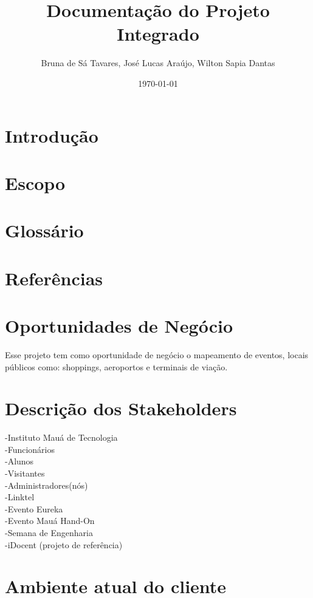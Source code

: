 \documentclass[13pt]{article}
\begin{document}
\title{Documentação do Projeto Integrado}
\author{Bruna de Sá Tavares, José Lucas Araújo, Wilton Sapia Dantas}
\date{\today}
\maketitle  


\section*{Introdução}

\section*{Escopo}

\section*{Glossário}

\section*{Referências}

\section*{Oportunidades de Negócio}
	Esse projeto tem como oportunidade de negócio o mapeamento de eventos, locais públicos como: shoppings, aeroportos e terminais de viação.

\section*{Descrição dos Stakeholders}
	-Instituto Mauá de Tecnologia \\
	-Funcionários \\
	-Alunos \\
	-Visitantes \\
	-Administradores(nós)\\
	-Linktel \\
	-Evento Eureka \\
	-Evento Mauá Hand-On \\
	-Semana de Engenharia \\
	-iDocent (projeto de referência) \\ 
	
\section*{Ambiente atual do cliente}
\end{document}
